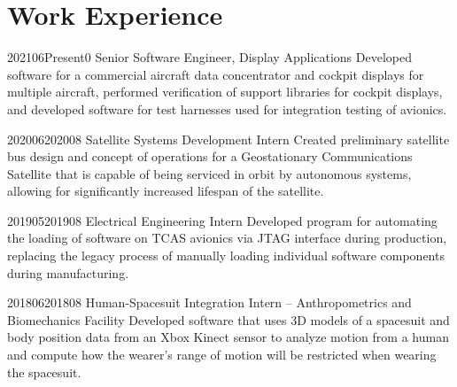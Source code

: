\documentclass[../Gabriel_Roper_Resume]{subfiles}
\begin{document}
\section{Work Experience}

{2021}{06}{Present}{0}
{Senior Software Engineer, Display Applications}
{
    Developed software for a commercial aircraft data concentrator and
    cockpit displays for multiple aircraft, performed verification of
    support libraries for cockpit displays, and developed software for
    test harnesses used for integration testing of avionics.
}

{2020}{06}{2020}{08}
{Satellite Systems Development Intern}
{
    Created preliminary satellite bus design and concept of operations
    for a Geostationary Communications Satellite that is capable of
    being serviced in orbit by autonomous systems, allowing for significantly
    increased lifespan of the satellite.
}

{2019}{05}{2019}{08}
{Electrical Engineering Intern}
{
    Developed program for automating the loading of software on TCAS avionics via JTAG
    interface during production, replacing the legacy process of manually loading individual
    software components during manufacturing.
}

{2018}{06}{2018}{08}
{Human-Spacesuit Integration Intern -- Anthropometrics and Biomechanics Facility}
{
    Developed software that uses 3D models of a spacesuit and body position data
    from an Xbox Kinect sensor to analyze motion from a human and compute how
    the wearer's range of motion will be restricted when wearing the spacesuit.
}

\end{document}
